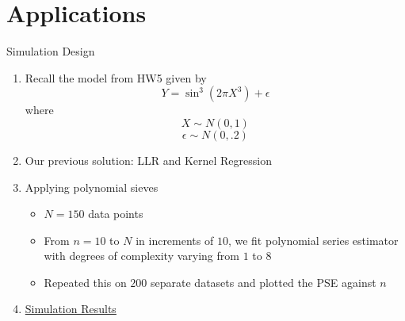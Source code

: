 \documentclass{beamer}
\begin{document}
\section{Applications}

\begin{frame}{Simulation Design}%
\begin{enumerate}
\item Recall the model from HW5 given by
$$Y = \sin^3(2\pi X^3) + \epsilon$$
where
$$X \sim N(0, 1)$$ $$ \epsilon \sim N(0, .2)$$
\item Our previous solution: LLR and Kernel Regression
\item Applying polynomial sieves 
\begin{itemize}
\item $N = 150$ data points
\item From $n = 10$ to $N$ in increments of $10$, we fit polynomial series estimator with degrees of complexity varying from $1$ to $8$
\item Repeated this on $200$ separate datasets and plotted the PSE against $n$
\end{itemize}
\item \href{https://raw.githubusercontent.com/matthewrw/Sieves_Project/master/R_code/sim_gif2.gif}{Simulation Results}
\end{enumerate}
\end{frame}
\end{document}
